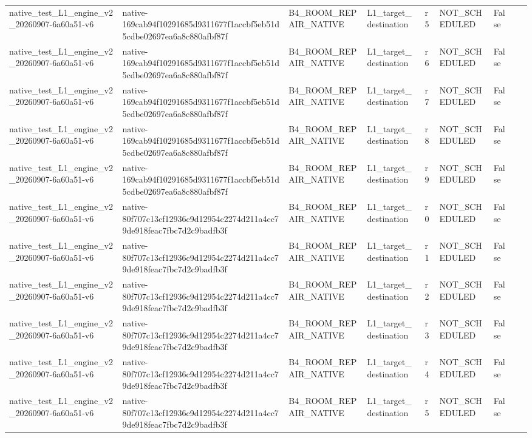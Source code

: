 \begin{tabular}{lllllllll}
native\_test\_L1\_engine\_v2\_20260907-6a60a51-v6 & native-169cab94f10291685d9311677f1accbf5eb51d5cdbe02697ea6a8c880afbf87f & B4\_ROOM\_REPAIR\_NATIVE & L1\_target\_destination & r5 & NOT\_SCHEDULED & False &  &  \\
native\_test\_L1\_engine\_v2\_20260907-6a60a51-v6 & native-169cab94f10291685d9311677f1accbf5eb51d5cdbe02697ea6a8c880afbf87f & B4\_ROOM\_REPAIR\_NATIVE & L1\_target\_destination & r6 & NOT\_SCHEDULED & False &  &  \\
native\_test\_L1\_engine\_v2\_20260907-6a60a51-v6 & native-169cab94f10291685d9311677f1accbf5eb51d5cdbe02697ea6a8c880afbf87f & B4\_ROOM\_REPAIR\_NATIVE & L1\_target\_destination & r7 & NOT\_SCHEDULED & False &  &  \\
native\_test\_L1\_engine\_v2\_20260907-6a60a51-v6 & native-169cab94f10291685d9311677f1accbf5eb51d5cdbe02697ea6a8c880afbf87f & B4\_ROOM\_REPAIR\_NATIVE & L1\_target\_destination & r8 & NOT\_SCHEDULED & False &  &  \\
native\_test\_L1\_engine\_v2\_20260907-6a60a51-v6 & native-169cab94f10291685d9311677f1accbf5eb51d5cdbe02697ea6a8c880afbf87f & B4\_ROOM\_REPAIR\_NATIVE & L1\_target\_destination & r9 & NOT\_SCHEDULED & False &  &  \\
native\_test\_L1\_engine\_v2\_20260907-6a60a51-v6 & native-80f707c13cf12936c9d12954c2274d211a4cc79de918feac7fbc7d2c9badfb3f & B4\_ROOM\_REPAIR\_NATIVE & L1\_target\_destination & r0 & NOT\_SCHEDULED & False &  &  \\
native\_test\_L1\_engine\_v2\_20260907-6a60a51-v6 & native-80f707c13cf12936c9d12954c2274d211a4cc79de918feac7fbc7d2c9badfb3f & B4\_ROOM\_REPAIR\_NATIVE & L1\_target\_destination & r1 & NOT\_SCHEDULED & False &  &  \\
native\_test\_L1\_engine\_v2\_20260907-6a60a51-v6 & native-80f707c13cf12936c9d12954c2274d211a4cc79de918feac7fbc7d2c9badfb3f & B4\_ROOM\_REPAIR\_NATIVE & L1\_target\_destination & r2 & NOT\_SCHEDULED & False &  &  \\
native\_test\_L1\_engine\_v2\_20260907-6a60a51-v6 & native-80f707c13cf12936c9d12954c2274d211a4cc79de918feac7fbc7d2c9badfb3f & B4\_ROOM\_REPAIR\_NATIVE & L1\_target\_destination & r3 & NOT\_SCHEDULED & False &  &  \\
native\_test\_L1\_engine\_v2\_20260907-6a60a51-v6 & native-80f707c13cf12936c9d12954c2274d211a4cc79de918feac7fbc7d2c9badfb3f & B4\_ROOM\_REPAIR\_NATIVE & L1\_target\_destination & r4 & NOT\_SCHEDULED & False &  &  \\
native\_test\_L1\_engine\_v2\_20260907-6a60a51-v6 & native-80f707c13cf12936c9d12954c2274d211a4cc79de918feac7fbc7d2c9badfb3f & B4\_ROOM\_REPAIR\_NATIVE & L1\_target\_destination & r5 & NOT\_SCHEDULED & False &  &  \\

\end{tabular}
